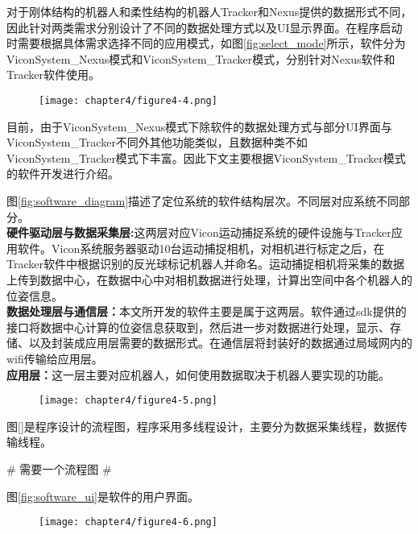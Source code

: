 对于刚体结构的机器人和柔性结构的机器人Tracker和Nexus提供的数据形式不同，因此针对两类需求分别设计了不同的数据处理方式以及UI显示界面。在程序启动时需要根据具体需求选择不同的应用模式，如图\ref{fig:select_mode}所示，软件分为ViconSystem\_Nexus模式和ViconSystem\_Tracker模式，分别针对Nexus软件和Tracker软件使用。
\begin{figure}[!htbp]
	\centering
	\texttt{[image: chapter4/figure4-4.png]}
\end{figure}

目前，由于ViconSystem\_Nexus模式下除软件的数据处理方式与部分UI界面与ViconSystem\_Tracker不同外其他功能类似，且数据种类不如ViconSystem\_Tracker模式下丰富。因此下文主要根据ViconSystem\_Tracker模式的软件开发进行介绍。

图\ref{fig:software_diagram}描述了定位系统的软件结构层次。不同层对应系统不同部分。\\
\indent \textbf{硬件驱动层与数据采集层:}这两层对应Vicon运动捕捉系统的硬件设施与Tracker应用软件。Vicon系统服务器驱动10台运动捕捉相机，对相机进行标定之后，在Tracker软件中根据识别的反光球标记机器人并命名。运动捕捉相机将采集的数据上传到数据中心，在数据中心中对相机数据进行处理，计算出空间中各个机器人的位姿信息。\\
\indent \textbf{数据处理层与通信层：}本文所开发的软件主要是属于这两层。软件通过sdk提供的接口将数据中心计算的位姿信息获取到，然后进一步对数据进行处理，显示、存储、以及封装成应用层需要的数据形式。在通信层将封装好的数据通过局域网内的wifi传输给应用层。\\
\indent \textbf{应用层：}这一层主要对应机器人，如何使用数据取决于机器人要实现的功能。

\begin{figure}[!htbp]
	\centering
	\texttt{[image: chapter4/figure4-5.png]}
\end{figure}

图\ref{}是程序设计的流程图，程序采用多线程设计，主要分为数据采集线程，数据传输线程。

\#
需要一个流程图
\#

图\ref{fig:software_ui}是软件的用户界面。
\begin{figure}[!htbp]
	\centering
	\texttt{[image: chapter4/figure4-6.png]}
\end{figure}

